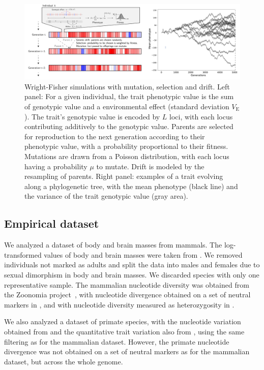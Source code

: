 \documentclass{article}
\newcommand{\MutationRatePheno}{\mu}
\newcommand{\NbrLoci}{L}
\newcommand{\VarEnv}{V_{\mathrm{E}}}
\begin{document}
\begin{figure}[!ht]
    \centering
    \includegraphics[width=\textwidth, page=1] {figure2}
    \caption{
        Wright-Fisher simulations with mutation, selection and drift.
        Left panel: For a given individual, the trait phenotypic value is the sum of genotypic value and a environmental effect (standard deviation $\VarEnv$).
        The trait's genotypic value is encoded by $\NbrLoci$ loci, with each locus contributing additively to the genotypic value.
        Parents are selected for reproduction to the next generation according to their phenotypic value, with a probability proportional to their fitness.
        Mutations are drawn from a Poisson distribution, with each locus having a probability $\MutationRatePheno$ to mutate.
        Drift is modeled by the resampling of parents.
        Right panel: examples of a trait evolving along a phylogenetic tree, with the mean phenotype (black line) and the variance of the trait genotypic value (gray area).
    }
    \label{fig:simulator}
\end{figure}

\subsection{Empirical dataset}\label{subsec:empirical-dataset}

We analyzed a dataset of body and brain masses from mammals.
The log-transformed values of body and brain masses were taken from \textcite{tsuboi_breakdown_2018}.
We removed individuals not marked as adults and split the data into males and females due to sexual dimorphism in body and brain masses.
We discarded species with only one representative sample.
The mammalian nucleotide diversity was obtained from the Zoonomia project~\parencite{genereux_comparative_2020}, with nucleotide divergence obtained on a set of neutral markers in \textcite{foley_genomic_2023}, and with nucleotide diversity measured as heterozygosity in \textcite{wilder_contribution_2023}.

We also analyzed a dataset of primate species, with the nucleotide variation obtained from \textcite{kuderna_global_2023} and the quantitative trait variation also from \textcite{tsuboi_breakdown_2018}, using the same filtering as for the mammalian dataset.
However, the primate nucleotide divergence was not obtained on a set of neutral markers as for the mammalian dataset, but across the whole genome.
\end{document}
